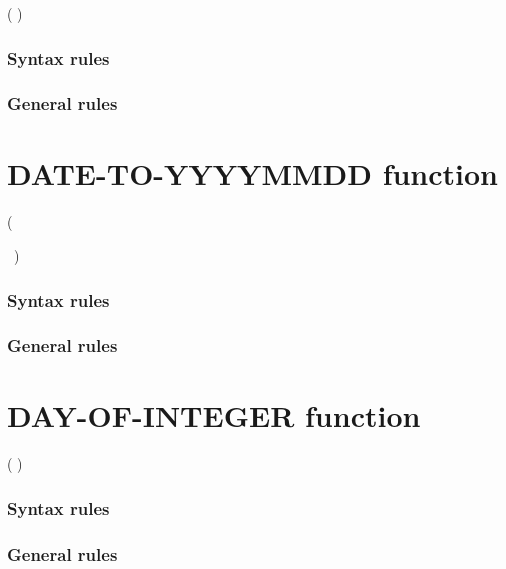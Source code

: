 \begin{syntax}
    ( \argument )
\end{syntax}

\subsubsection{Syntax rules}

\subsubsection{General rules}

\section{DATE-TO-YYYYMMDD function}

\begin{syntax}
    (
  \argument
  \begin{0-1}
    \argument
    \begin{0-1}
      \argument
    \end{0-1}
  \end{0-1}
  \ {})
\end{syntax}

\subsubsection{Syntax rules}

\subsubsection{General rules}

\section{DAY-OF-INTEGER function}

\begin{syntax}
    ( \argument )
\end{syntax}

\subsubsection{Syntax rules}

\subsubsection{General rules}

